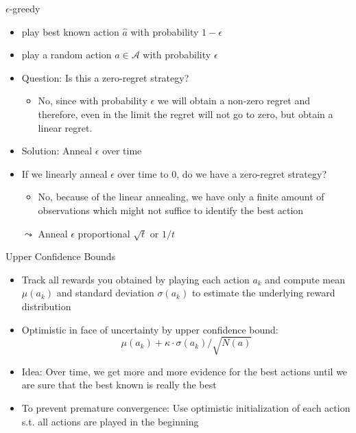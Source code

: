 \begin{frame}[c]{$\epsilon$-greedy}
	
	\begin{itemize}
		\item play best known action $\hat{a}$ with probability $1-\epsilon$
		\item play a random action $a \in \mathcal{A}$ with probability $\epsilon$ 
		\smallskip
		\item Question: Is this a zero-regret strategy?
		\pause
		\begin{itemize}
			\item No, since with probability $\epsilon$ we will obtain a non-zero regret and therefore, even in the limit the regret will not go to zero, but obtain a linear regret.
		\end{itemize}
		\smallskip\pause
		\item Solution: Anneal $\epsilon$ over time
		\item If we linearly anneal $\epsilon$ over time to $0$, do we have a zero-regret strategy?
		\pause
		\begin{itemize}
			\item No, because of the linear annealing, we have only a finite amount of observations which might not suffice to identify the best action
		\end{itemize}
		\smallskip
		\item[$\leadsto$] Anneal $\epsilon$ proportional $\sqrt{t}$ or $1/t$
	\end{itemize}
	
\end{frame}
\begin{frame}[c]{Upper Confidence Bounds}
	
	\begin{itemize}
		\item Track all rewards you obtained by playing each action $a_k$ and compute mean $\mu(a_k)$ and standard deviation $\sigma(a_k)$ to estimate the underlying reward distribution
		\item Optimistic in face of uncertainty by upper confidence bound:
		$$\mu(a_k) + \kappa \cdot \sigma(a_k) / \sqrt{N(a)}$$
		\item Idea: Over time, we get more and more evidence for the best actions until we are sure that the best known is really the best
		\medskip
		\pause
		\item To prevent premature convergence: Use optimistic initialization of each action s.t. all actions are played in the beginning
	\end{itemize}
	
\end{frame}
